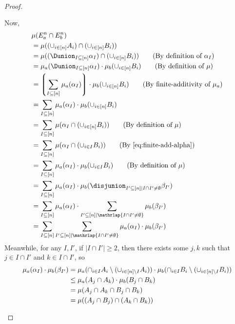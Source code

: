 \begin{proof}
\begin{itemize}
   Now,
  \begin{align}
   &\mu(E^n_a \cap E^n_b) \notag \\
   &= \mu((\cup_{i \in [n]} A_i) \cap (\cup_{i \in [n]} B_i)) \notag \\
   &= \mu((\Dunion_{I \subseteq [n]} \alpha_I) \cap (\cup_{i \in [n]} B_i)) \tag{By definition of $\alpha_I$}\\
   &= \mu_a(\Dunion_{I \subseteq [n]} \alpha_I) \cdot  \mu_b(\cup_{i \in [n]} B_i)  \tag{By definition of $\mu$} \\
   &= \left\lgroup\sum_{I \subseteq [n]} \mu_a (\alpha_I) \right\rgroup \cdot  \mu_b(\cup_{i \in [n]} B_i)  \tag{By finite-additivity of $\mu_a$} \\
   &= \sum_{I \subseteq [n]} \mu_a (\alpha_I) \cdot  \mu_b(\cup_{i \in [n]} B_i) \notag\\
   &= \sum_{I \subseteq [n]}  \mu(\alpha_I \cap (\cup_{i \in [n]} B_i)) \tag{By definition of $\mu$} \\
   &= \sum_{I \subseteq [n]}  \mu(\alpha_I \cap (\cup_{i \in I} B_i))
   \tag{By~\cref{eq:finite-add-alpha}}\\
   &= \sum_{I \subseteq [n]}  \mu_a(\alpha_I) \cdot \mu_b (\cup_{i \in I} B_i)\tag{By definition of $\mu$} \\
   &= \sum_{I \subseteq [n]}  \mu_a(\alpha_I) \cdot \mu_b (\disjunion_{I' \subseteq [n] \mid I \cap I' \neq \emptyset} \beta_{I'}) \notag \\
   &= \sum_{I \subseteq [n]}  \mu_a(\alpha_I) \cdot \sum_{I' \subseteq [n] \mid \mathrlap{I \cap I' \neq \emptyset}} \mu_b (\beta_{I'}) \notag \\
   &= \sum_{I \subseteq [n]} \sum_{I' \subseteq [n] \mid \mathrlap{I \cap I' \neq \emptyset}}  \mu_a(\alpha_I) \cdot \mu_b (\beta_{I'}) \notag
  \end{align}
Meanwhile, for any $I, I'$, if $|I \cap I'| \geq 2$,
  then there exists some $j, k$ such that $j \in I \cap I'$ and $k \in I \cap I'$,
  so
\begin{align}
    \mu_{a}(\alpha_I) \cdot \mu_{b}(\beta_{I'})
    &= \mu_{a}(\cap_{i \in I} A_i \setminus (\cup_{i \in [n] \setminus I} A_i)) \cdot \mu_{b}(\cap_{i \in I} B_i \setminus (\cup_{i \in [n] \setminus I} B_i)) \notag \\
    &\leq \mu_{a}(A_j \cap A_k) \cdot \mu_{b}(B_j \cap B_k) \notag \\
    &= \mu(A_j \cap A_k \cap B_j \cap B_k) \notag \\
    &= \mu((A_j\cap B_j) \cap (A_k \cap B_k)) \notag \\

\end{align}
\end{itemize}
\end{proof}

